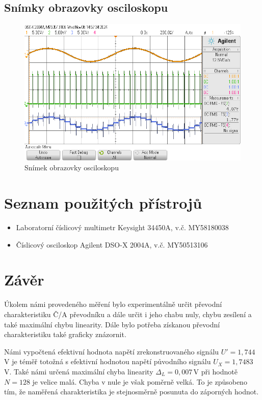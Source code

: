 \documentclass[a4paper, czech]{article}
\begin{document}
\subsection{Snímky obrazovky osciloskopu}

\begin{figure}[H]
    \centering
    \includegraphics[width=\textwidth]{osc_6A_1.png}
    \caption{Snímek obrazovky osciloskopu}
\end{figure}

\section{Seznam použitých přístrojů}

\begin{itemize}
    \item Laboratorní číslicový multimetr Keysight 34450A, v.č. MY58180038
    \item Číslicový osciloskop Agilent DSO-X 2004A, v.č. MY50513106
\end{itemize}

\section{Závěr}

Úkolem námi provedeného měření bylo experimentálně určit převodní charakteristiku Č/A převodníku a dále určit i jeho chabu nuly, chybu zesílení a také maximální chybu linearity.
Dále bylo potřeba získanou převodní charakteristiku také graficky znázornit.

Námi vypočtená efektivní hodnota napětí zrekonstruovaného signálu $U' = 1,744\,$V je téměř totožná s efektivní hodnotou napětí původního signálu $U_X = 1,7483\,$V.
Také námi určená maximální chyba linearity $\Delta_L = 0,007\,$V při hodnotě $N = 128$ je velice malá.
Chyba v nule je však poměrně velká.
To je způsobeno tím, že naměřená charakteristika je stejnosměrně posunuta do záporných hodnot.
\end{document}
